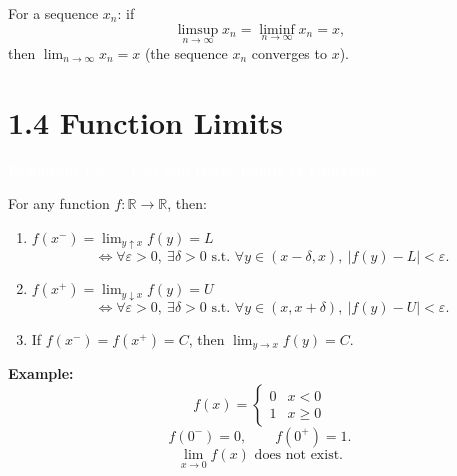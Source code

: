 \documentclass[11pt]{article}
\newcommand{\deftitle}[1]{%
  \vspace{0.6em}
  \noindent\colorbox{defbg!70}{\parbox{\dimexpr\textwidth-2\fboxsep}{\textbf{\textcolor{white}{#1}}}}
  \vspace{0.4em}
}
\begin{document}
\noindent For a sequence $x_n$: if
\[
\limsup_{n \to \infty} x_n = \liminf_{n \to \infty} x_n = x,
\]
then $\displaystyle\lim_{n \to \infty} x_n = x$ (the sequence $x_n$ converges to $x$).

\section*{1.4 Function Limits}

\deftitle{Definition 1.3 --- Left and Right Limits of Functions}

For any function $f: \mathbb{R} \to \mathbb{R}$, then:

\begin{enumerate}
  \item $f(x^-) = \displaystyle\lim_{y \uparrow x} f(y) = L$
  \[
  \iff \forall \varepsilon > 0,\ \exists \delta > 0 \text{ s.t. } \forall y \in (x-\delta, x),\ |f(y) - L| < \varepsilon.
  \]
  \item $f(x^+) = \displaystyle\lim_{y \downarrow x} f(y) = U$
  \[
  \iff \forall \varepsilon > 0,\ \exists \delta > 0 \text{ s.t. } \forall y \in (x, x+\delta),\ |f(y) - U| < \varepsilon.
  \]
  \item If $f(x^-) = f(x^+) = C$, then $\displaystyle\lim_{y \to x} f(y) = C$.
\end{enumerate}

\noindent \textbf{Example:}
\[
f(x) = \begin{cases} 0 & x < 0 \\ 1 & x \ge 0 \end{cases}
\]
\[
f(0^-) = 0, \qquad f(0^+) = 1.
\]
\[
\lim_{x \to 0} f(x) \text{ does not exist.}
\]
\end{document}
